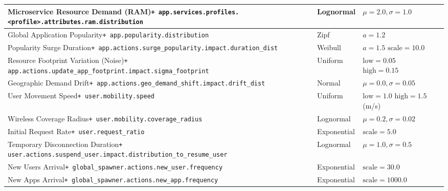 \documentclass[ASNA]{USG} %
\begin{document}
\begin{table}[!ht]
\begin{tabular*}{\textwidth}{@{\extracolsep\fill}p{6.2cm} p{2.2cm} p{2.8cm} p{2.5cm}@{\extracolsep\fill}}
\midrule
Microservice Resource Demand (RAM)\newline \texttt{+ app.services.profiles.<profile>.attributes.ram.distribution} & Lognormal & $\mu=2.0, \sigma=1.0$ & \cite{10.1145/3132747.3132772} \\
\midrule
Global Application Popularity\newline \texttt{+ app.popularity.distribution} & Zipf & $a=1.2$ & \cite{749260} \\
\midrule
Popularity Surge Duration\newline \texttt{+ app.actions.surge\_popularity.impact.duration\_dist} & Weibull & $a=1.5$ \newline $\text{scale}=10.0$& \cite{10.1145/1298306.1298309} \\
\midrule
Resource Footprint Variation (Noise)\newline \texttt{+ app.actions.update\_app\_footprint.impact.sigma\_footprint} & Uniform & $\text{low}=0.05$ \newline $\text{high}=0.15$ & \cite{3388242.3388280} \\
\midrule
Geographic Demand Drift\newline \texttt{+ app.actions.geo\_demand\_shift.impact.drift\_dist} & Normal & $\mu=0.0, \sigma=0.05$ & \cite{10.1002/wcm.72} \\

\midrule
User Movement Speed\newline \texttt{+ user.mobility.speed} & Uniform & $\text{low}=1.0$ \newline $\text{high}=1.5$ (m/s) & \cite{10.1002/wcm.72} \\
\midrule
Wireless Coverage Radius\newline \texttt{+ user.mobility.coverage\_radius} & Lognormal & $\mu=0.2, \sigma=0.02$ & \cite{Rappaport_2024} \\
\midrule
Initial Request Rate\newline \texttt{+ user.request\_ratio} & Exponential & $\text{scale}=5.0$ & \cite{10.1145/190809.190338} \\
\midrule
Temporary Disconnection Duration\newline \texttt{+ user.actions.suspend\_user.impact.distribution\_to\_resume\_user} & Lognormal & $\mu=1.0, \sigma=0.5$ & \cite{10.1145/2307636.2307658} \\

\midrule
New Users Arrival\newline \texttt{+ global\_spawner.actions.new\_user.frequency} & Exponential & $\text{scale}=30.0$ & \cite{10.1145/233008.233034} \\
\midrule
New Apps Arrival\newline \texttt{+ global\_spawner.actions.new\_app.frequency} & Exponential & $\text{scale}=1000.0$ & \cite{10.1145/233008.233034} \\
\bottomrule
\end{tabular*}
\end{table}
\end{document}
